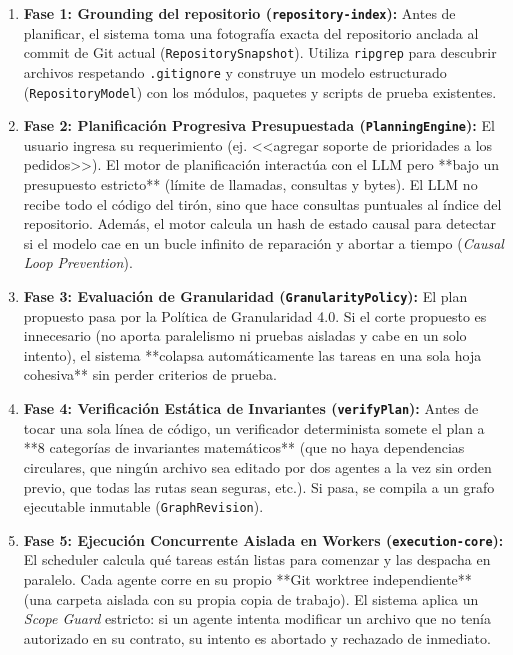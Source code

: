 \documentclass[11pt,a4paper]{article}
\begin{document}
\begin{enumerate}[leftmargin=1.5cm]
  \item \textbf{Fase 1: Grounding del repositorio (\texttt{repository-index}):}  
  Antes de planificar, el sistema toma una fotografía exacta del repositorio anclada al commit de Git actual (\texttt{RepositorySnapshot}). Utiliza \texttt{ripgrep} para descubrir archivos respetando \texttt{.gitignore} y construye un modelo estructurado (\texttt{RepositoryModel}) con los módulos, paquetes y scripts de prueba existentes.
  
  \item \textbf{Fase 2: Planificación Progresiva Presupuestada (\texttt{PlanningEngine}):}  
  El usuario ingresa su requerimiento (ej. <<agregar soporte de prioridades a los pedidos>>). El motor de planificación interactúa con el LLM pero **bajo un presupuesto estricto** (límite de llamadas, consultas y bytes). El LLM no recibe todo el código del tirón, sino que hace consultas puntuales al índice del repositorio. Además, el motor calcula un hash de estado causal para detectar si el modelo cae en un bucle infinito de reparación y abortar a tiempo (\emph{Causal Loop Prevention}).

  \item \textbf{Fase 3: Evaluación de Granularidad (\texttt{GranularityPolicy}):}  
  El plan propuesto pasa por la Política de Granularidad 4.0. Si el corte propuesto es innecesario (no aporta paralelismo ni pruebas aisladas y cabe en un solo intento), el sistema **colapsa automáticamente las tareas en una sola hoja cohesiva** sin perder criterios de prueba.

  \item \textbf{Fase 4: Verificación Estática de Invariantes (\texttt{verifyPlan}):}  
  Antes de tocar una sola línea de código, un verificador determinista somete el plan a **8 categorías de invariantes matemáticos** (que no haya dependencias circulares, que ningún archivo sea editado por dos agentes a la vez sin orden previo, que todas las rutas sean seguras, etc.). Si pasa, se compila a un grafo ejecutable inmutable (\texttt{GraphRevision}).

  \item \textbf{Fase 5: Ejecución Concurrente Aislada en Workers (\texttt{execution-core}):}  
  El scheduler calcula qué tareas están listas para comenzar y las despacha en paralelo. Cada agente corre en su propio **Git worktree independiente** (una carpeta aislada con su propia copia de trabajo). El sistema aplica un \emph{Scope Guard} estricto: si un agente intenta modificar un archivo que no tenía autorizado en su contrato, su intento es abortado y rechazado de inmediato.


\end{enumerate}
\end{document}
